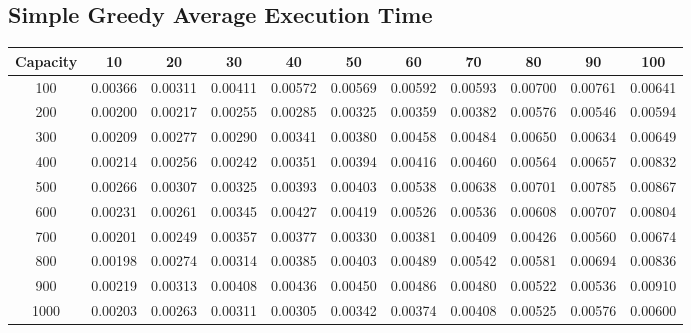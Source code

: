 \documentclass{article}
\begin{document}
\subsection{Simple Greedy Average Execution Time}
\begin{center}
\begin{tabular}{ccccccccccc}
\toprule
Capacity & 10 & 20 & 30 & 40 & 50 & 60 & 70 & 80 & 90 & 100 \\
\midrule
100 & 0.00366 & 0.00311 & 0.00411 & 0.00572 & 0.00569 & 0.00592 & 0.00593 & 0.00700 & 0.00761 & 0.00641 \\
200 & 0.00200 & 0.00217 & 0.00255 & 0.00285 & 0.00325 & 0.00359 & 0.00382 & 0.00576 & 0.00546 & 0.00594 \\
300 & 0.00209 & 0.00277 & 0.00290 & 0.00341 & 0.00380 & 0.00458 & 0.00484 & 0.00650 & 0.00634 & 0.00649 \\
400 & 0.00214 & 0.00256 & 0.00242 & 0.00351 & 0.00394 & 0.00416 & 0.00460 & 0.00564 & 0.00657 & 0.00832 \\
500 & 0.00266 & 0.00307 & 0.00325 & 0.00393 & 0.00403 & 0.00538 & 0.00638 & 0.00701 & 0.00785 & 0.00867 \\
600 & 0.00231 & 0.00261 & 0.00345 & 0.00427 & 0.00419 & 0.00526 & 0.00536 & 0.00608 & 0.00707 & 0.00804 \\
700 & 0.00201 & 0.00249 & 0.00357 & 0.00377 & 0.00330 & 0.00381 & 0.00409 & 0.00426 & 0.00560 & 0.00674 \\
800 & 0.00198 & 0.00274 & 0.00314 & 0.00385 & 0.00403 & 0.00489 & 0.00542 & 0.00581 & 0.00694 & 0.00836 \\
900 & 0.00219 & 0.00313 & 0.00408 & 0.00436 & 0.00450 & 0.00486 & 0.00480 & 0.00522 & 0.00536 & 0.00910 \\
1000 & 0.00203 & 0.00263 & 0.00311 & 0.00305 & 0.00342 & 0.00374 & 0.00408 & 0.00525 & 0.00576 & 0.00600 \\
\bottomrule
\end{tabular}
\end{center}
\end{document}
